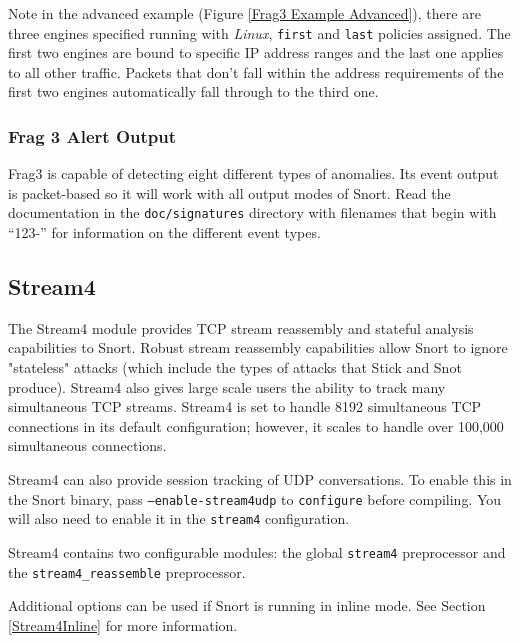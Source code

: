 \documentclass[english]{report}
\newenvironment{note}{
\samepage
    \vspace{10pt}{\textsf{
        {\hspace{7pt}\Huge{$\triangle$\hspace{-12.5pt}{\Large{$^!$}}}}\hspace{5pt}
        {\Large{NOTE}}
    }
    }
   \begin{center}
    \par\vspace{-17pt}

    \begin{lrbox}{\savepar}
    \begin{minipage}[r]{6in}
}
{
    \end{minipage}
    \end{lrbox}
    \fbox{
        \usebox{
            \savepar
	}
    }
    \par\vskip10pt
    \end{center}
}
\newenvironment{note}{
        \begin{rawhtml}
        <p><table border="1"><tr><td><b>
        Note:&nbsp;&nbsp;</b>
        \end{rawhtml}
}{
        \begin{rawhtml}
        </b></td></tr></table></p>
        \end{rawhtml}
}
\begin{document}
Note in the advanced example (Figure \ref{Frag3 Example Advanced}), there are three engines specified running with 
\emph{Linux}, \texttt{first} and \texttt{last} policies assigned.  The first two engines are bound to
specific IP address ranges and the last one applies to all other traffic.
Packets that don't fall within the address requirements of the first two engines
automatically fall through to the third one.

\subsubsection{Frag 3 Alert Output\label{frag3 alert output}}

Frag3 is capable of detecting eight different types of anomalies.  Its event
output is packet-based so it will work with all output modes of Snort.  Read
the documentation in the \texttt{doc/signatures} directory with filenames that begin
with ``123-'' for information on the different event types.



\subsection{Stream4\label{stream 4 section}}

The Stream4 module provides TCP stream reassembly and stateful analysis
capabilities to Snort. Robust stream reassembly capabilities allow Snort
to ignore "stateless" attacks (which include the types of attacks that
Stick and Snot produce). Stream4 also gives large scale users the ability
to track many simultaneous TCP streams.  Stream4 is set to handle 8192
simultaneous TCP connections in its default configuration; however, it
scales to handle over 100,000 simultaneous connections.

Stream4 can also provide session tracking of UDP conversations. To enable
this in the Snort binary, pass \texttt{--enable-stream4udp} to
\texttt{configure} before compiling.  You will also need to enable it
in the \texttt{stream4} configuration.

Stream4 contains two configurable modules: the global \texttt{stream4} preprocessor
and the \texttt{stream4\_reassemble} preprocessor. 

\begin{note}
Additional options can be used if Snort is running in inline mode. See Section \ref{Stream4Inline} for more information.
\end{note}
\end{document}
